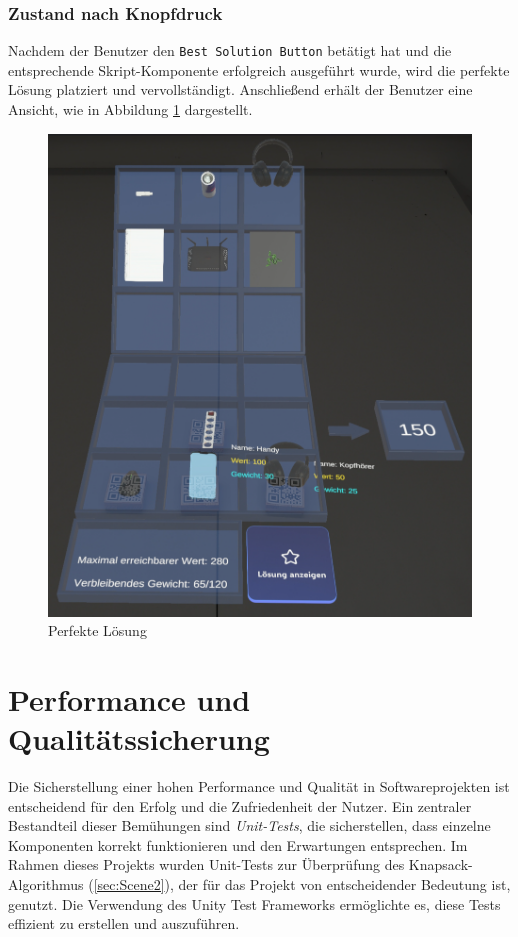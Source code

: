 \subsubsection{Zustand nach Knopfdruck}
Nachdem der Benutzer den \texttt{Best Solution Button} betätigt hat und die entsprechende Skript-Komponente erfolgreich
ausgeführt wurde, wird die perfekte Lösung platziert und vervollständigt. Anschließend erhält der Benutzer eine Ansicht,
wie in Abbildung \ref{fig:perfSolUserPOV} dargestellt.
\begin{figure}[H]
    \centering
    \includegraphics[width=\textwidth]{images/perfSolUserPOV}
    \caption{Perfekte Lösung}
    \label{fig:perfSolUserPOV}
\end{figure}



\section{Performance und Qualitätssicherung} 

Die Sicherstellung einer hohen Performance und Qualität in Softwareprojekten ist entscheidend für den Erfolg und die Zufriedenheit der Nutzer. Ein zentraler Bestandteil dieser Bemühungen sind \textit{Unit-Tests}, die sicherstellen, dass einzelne Komponenten korrekt funktionieren und den Erwartungen entsprechen. Im Rahmen dieses Projekts wurden Unit-Tests zur Überprüfung des Knapsack-Algorithmus (\ref{sec:Scene2}), der für das Projekt von entscheidender Bedeutung ist, genutzt. Die Verwendung des Unity Test Frameworks ermöglichte es, diese Tests effizient zu erstellen und auszuführen.

